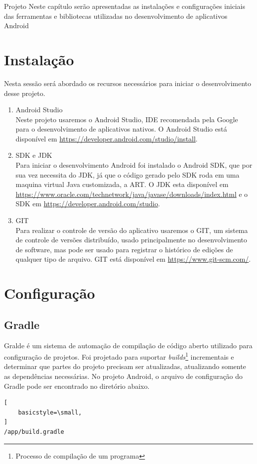 \documentclass[
	12pt,				%
	openright,			%
	twoside,			%
	a4paper,			%
	english,			%
	french,				%
	spanish,			%
	brazil				%
	]{abntex2}
\begin{document}
\begin{chapter}{Projeto}
Neste capítulo serão apresentadas as instalações e configurações iniciais das ferramentas e bibliotecas utilizadas no desenvolvimento de aplicativos Android
\section{Instalação}
Nesta sessão será abordado os  recursos necessários para iniciar o desenvolvimento desse projeto.
\begin{enumerate}
  \item{Android Studio} \\
  Neste projeto usaremos o Android Studio, IDE recomendada pela Google para o desenvolvimento de aplicativos nativos. O Android Studio está disponível em \url{https://developer.android.com/studio/install}.
  \item{SDK e JDK} \\ Para iniciar o desenvolvimento Android foi instalado o Android SDK, que por sua vez necessita do JDK, já que o código gerado pelo SDK roda em uma maquina virtual Java customizada, a ART.
  O JDK esta disponível em \url{https://www.oracle.com/technetwork/java/javase/downloads/index.html} e o SDK em \url{https://developer.android.com/studio}.
  \item{GIT} \\
  Para realizar o controle de versão do aplicativo usaremos o GIT, um sistema de controle de versões distribuído, usado principalmente no desenvolvimento de software, mas pode ser usado para registrar o histórico de edições de qualquer tipo de arquivo. 
  GIT está disponível em \url{https://www.git-scm.com/}.
  
\end{enumerate}






\section{Configuração}
\subsection{Gradle}
Gralde é um sistema de automação de compilação de código aberto utilizado para configuração de projetos. Foi projetado para suportar \textit{builds}\footnote{Processo de compilação de um programa} incrementais e determinar que partes do projeto precisam ser atualizadas, atualizando somente as dependências necessárias.
No projeto Android, o arquivo de configuração do Gradle pode ser encontrado no diretório abaixo. \begin{lstlisting}[
    basicstyle=\small,
]
/app/build.gradle
\end{lstlisting}

\end{chapter}
\end{document}
